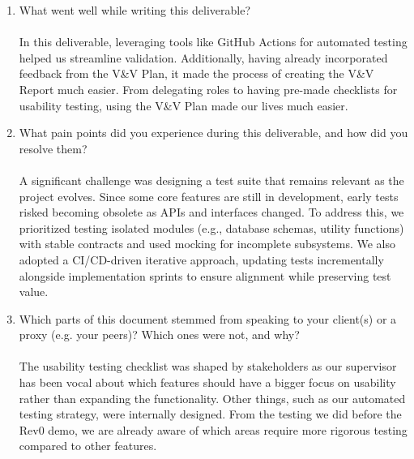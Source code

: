 \documentclass[12pt, titlepage]{article}
\begin{document}
\begin{enumerate}
  \item What went well while writing this deliverable?\\
\\
In this deliverable, leveraging tools like GitHub Actions for automated testing helped us streamline validation. Additionally, having already incorporated feedback from the V\&V Plan, it made the process of creating the V\&V Report much easier. From delegating roles to having pre-made checklists for usability testing, using the V\&V Plan made our lives much easier.\\

  \item What pain points did you experience during this deliverable, and how
    did you resolve them?\\
\\
A significant challenge was designing a test suite that remains relevant as the project evolves. Since some core features are still in development, early tests risked becoming obsolete as APIs and interfaces changed. To address this, we prioritized testing isolated modules (e.g., database schemas, utility functions) with stable contracts and used mocking for incomplete subsystems. We also adopted a CI/CD-driven iterative approach, updating tests incrementally alongside implementation sprints to ensure alignment while preserving test value.\\

  \item Which parts of this document stemmed from speaking to your client(s) or
  a proxy (e.g. your peers)? Which ones were not, and why?\\
\\
The usability testing checklist was shaped by stakeholders as our supervisor has been vocal about which features should have a bigger focus on usability rather than expanding the functionality. Other things, such as our automated testing strategy, were internally designed. From the testing we did before the Rev0 demo, we are already aware of which areas require more rigorous testing compared to other features.\\
  

\end{enumerate}
\end{document}
